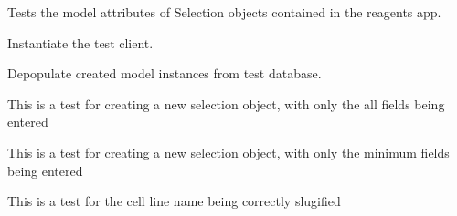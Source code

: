 \documentclass[letterpaper,10pt,english]{sphinxmanual}
\begin{document}

\begin{fulllineitems}
\label{api:experimentdb.reagents.tests.SelectionModelTests}
Tests the model attributes of Selection objects contained in the reagents app.

\begin{fulllineitems}
\label{api:experimentdb.reagents.tests.SelectionModelTests.setUp}
Instantiate the test client.

\end{fulllineitems}


\begin{fulllineitems}
\label{api:experimentdb.reagents.tests.SelectionModelTests.tearDown}
Depopulate created model instances from test database.

\end{fulllineitems}


\begin{fulllineitems}
\label{api:experimentdb.reagents.tests.SelectionModelTests.test_create_selection_all_fields}
This is a test for creating a new selection object, with only the all fields being entered

\end{fulllineitems}


\begin{fulllineitems}
\label{api:experimentdb.reagents.tests.SelectionModelTests.test_create_selection_minimal}
This is a test for creating a new selection object, with only the minimum fields being entered

\end{fulllineitems}


\begin{fulllineitems}
\label{api:experimentdb.reagents.tests.SelectionModelTests.test_selection_slugify}
This is a test for the cell line name being correctly slugified

\end{fulllineitems}


\end{fulllineitems}
\end{document}
